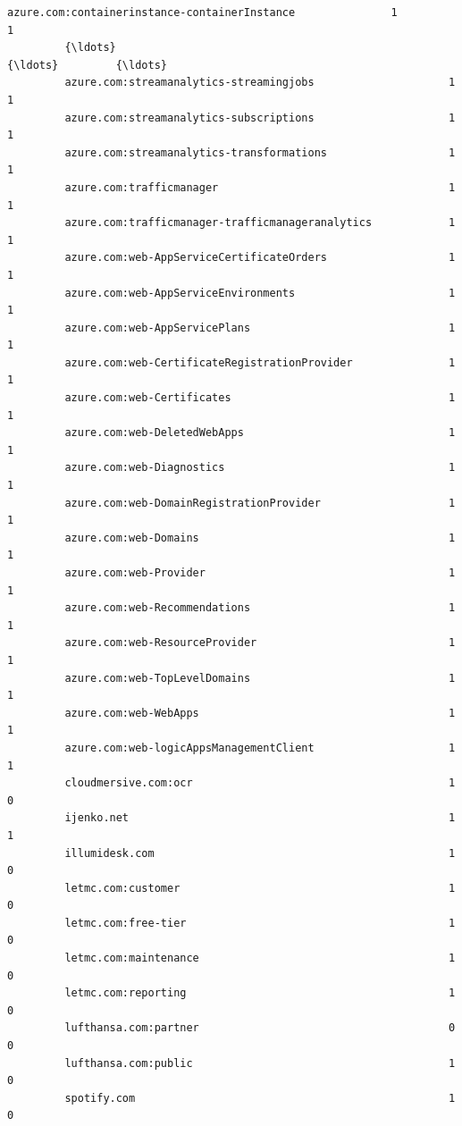 \documentclass[11pt]{article}
\begin{document}
\begin{Verbatim}[commandchars=\\\{\}]
         azure.com:containerinstance-containerInstance               1           1   
         {\ldots}                                                       {\ldots}         {\ldots}   
         azure.com:streamanalytics-streamingjobs                     1           1   
         azure.com:streamanalytics-subscriptions                     1           1   
         azure.com:streamanalytics-transformations                   1           1   
         azure.com:trafficmanager                                    1           1   
         azure.com:trafficmanager-trafficmanageranalytics            1           1   
         azure.com:web-AppServiceCertificateOrders                   1           1   
         azure.com:web-AppServiceEnvironments                        1           1   
         azure.com:web-AppServicePlans                               1           1   
         azure.com:web-CertificateRegistrationProvider               1           1   
         azure.com:web-Certificates                                  1           1   
         azure.com:web-DeletedWebApps                                1           1   
         azure.com:web-Diagnostics                                   1           1   
         azure.com:web-DomainRegistrationProvider                    1           1   
         azure.com:web-Domains                                       1           1   
         azure.com:web-Provider                                      1           1   
         azure.com:web-Recommendations                               1           1   
         azure.com:web-ResourceProvider                              1           1   
         azure.com:web-TopLevelDomains                               1           1   
         azure.com:web-WebApps                                       1           1   
         azure.com:web-logicAppsManagementClient                     1           1   
         cloudmersive.com:ocr                                        1           0   
         ijenko.net                                                  1           1   
         illumidesk.com                                              1           0   
         letmc.com:customer                                          1           0   
         letmc.com:free-tier                                         1           0   
         letmc.com:maintenance                                       1           0   
         letmc.com:reporting                                         1           0   
         lufthansa.com:partner                                       0           0   
         lufthansa.com:public                                        1           0   
         spotify.com                                                 1           0   
         

\end{Verbatim}
\end{document}
